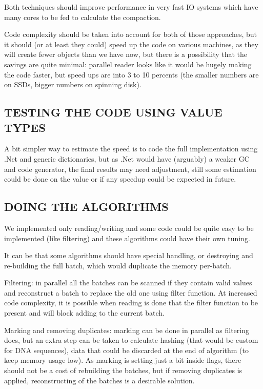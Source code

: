 \documentclass[a4paper,twoside]{article}
\begin{document}
Both techniques should improve performance in very fast IO systems which have many cores to be fed to calculate the compaction.

Code complexity should be taken into account for both of those approaches, but it should (or at least they could) speed up the code on various machines, as they will
create fewer objects than we have now, but there is a possibility that the savings are quite minimal: parallel reader looks like it would be hugely making the code
faster, but speed ups are into 3 to 10 percents (the smaller numbers are on SSDs, bigger numbers on spinning disk).

\subsection{\uppercase{Testing the code using Value Types}}


A bit simpler way to estimate the speed is to code the full implementation using .Net and generic dictionaries, but as .Net would have (arguably) a weaker GC and code generator, the final results may need adjustment, still some estimation could be done on the value or if any speedup could be expected in future.

\subsection{\uppercase{Doing the algorithms}}

We implemented only reading/writing and some code could be quite easy to be implemented (like filtering) and these algorithms could have their own tuning. 

It can be that some algorithms should have special handling, or destroying and re-building the full batch, which would duplicate the memory per-batch.

Filtering: in parallel all the batches can be scanned if they contain valid values and reconstruct a batch to replace the old one using filter function. At increased code complexity, it is possible when reading is done that the filter function to be present and will block adding to the current batch.

Marking and removing duplicates: marking can be done in parallel as filtering does, but an extra step can be taken to calculate hashing (that would be custom for DNA sequences), data that could be discarded at the end of algorithm (to keep memory usage low). As marking is setting just a bit inside flags, there should not be a cost of rebuilding the batches, but if removing duplicates is applied, reconstructing of the batches is a desirable solution.
\end{document}
